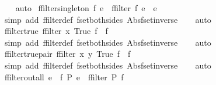 \begin{isabellebody}
%
\isadelimproof
\ \ %
\endisadelimproof
%
\isatagproof
{}\isamarkupfalse%
\ auto%
\endisatagproof
{\isafoldproof}%
%
\isadelimproof
\isanewline
%
\endisadelimproof
\isanewline
{}\isamarkupfalse%
\ ffilter{\isacharunderscore}singleton{\isacharcolon}\ {\isachardoublequoteopen}f\ e\ {\isasymLongrightarrow}\ ffilter\ f\ {\isacharbraceleft}{\isacharbar}e{\isacharbar}{\isacharbraceright}\ {\isacharequal}\ {\isacharbraceleft}{\isacharbar}e{\isacharbar}{\isacharbraceright}{\isachardoublequoteclose}\isanewline
%
\isadelimproof
\ \ %
\endisadelimproof
%
\isatagproof
{}\isamarkupfalse%
\ {\isacharparenleft}simp\ add{\isacharcolon}\ ffilter{\isacharunderscore}def\ fset{\isacharunderscore}both{\isacharunderscore}sides\ Abs{\isacharunderscore}fset{\isacharunderscore}inverse{\isacharparenright}\isanewline
\ \ \isamarkupfalse%
\ auto%
\endisatagproof
{\isafoldproof}%
%
\isadelimproof
\isanewline
%
\endisadelimproof
\isanewline
{}\isamarkupfalse%
\ ffilter{\isacharunderscore}true{\isacharcolon}\ {\isachardoublequoteopen}ffilter\ {\isacharparenleft}{\isasymlambda}x{\isachardot}\ True{\isacharparenright}\ f\ {\isacharequal}\ f{\isachardoublequoteclose}\isanewline
%
\isadelimproof
\ \ %
\endisadelimproof
%
\isatagproof
{}\isamarkupfalse%
\ {\isacharparenleft}simp\ add{\isacharcolon}\ ffilter{\isacharunderscore}def\ fset{\isacharunderscore}both{\isacharunderscore}sides\ Abs{\isacharunderscore}fset{\isacharunderscore}inverse{\isacharparenright}\isanewline
\ \ \isamarkupfalse%
\ auto%
\endisatagproof
{\isafoldproof}%
%
\isadelimproof
\isanewline
%
\endisadelimproof
\isanewline
{}\isamarkupfalse%
\ ffilter{\isacharunderscore}true{\isacharunderscore}pair{\isacharcolon}\ {\isachardoublequoteopen}ffilter\ {\isacharparenleft}{\isasymlambda}{\isacharparenleft}x{\isacharcomma}\ y{\isacharparenright}{\isachardot}\ True{\isacharparenright}\ f\ {\isacharequal}\ f{\isachardoublequoteclose}\isanewline
%
\isadelimproof
\ \ %
\endisadelimproof
%
\isatagproof
{}\isamarkupfalse%
\ {\isacharparenleft}simp\ add{\isacharcolon}\ ffilter{\isacharunderscore}def\ fset{\isacharunderscore}both{\isacharunderscore}sides\ Abs{\isacharunderscore}fset{\isacharunderscore}inverse{\isacharparenright}\isanewline
\ \ \isamarkupfalse%
\ auto%
\endisatagproof
{\isafoldproof}%
%
\isadelimproof
\isanewline
%
\endisadelimproof
\isanewline
{}\isamarkupfalse%
\ ffilter{\isacharunderscore}out{\isacharunderscore}all{\isacharcolon}\ {\isachardoublequoteopen}{\isasymforall}e\ {\isacharbar}{\isasymin}{\isacharbar}\ f{\isachardot}\ {\isasymnot}P\ e\ {\isasymLongrightarrow}\ ffilter\ P\ f\ {\isacharequal}\ {\isacharbraceleft}{\isacharbar}{\isacharbar}{\isacharbraceright}{\isachardoublequoteclose}\isanewline

\end{isabellebody}
